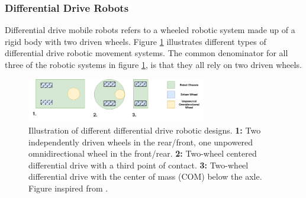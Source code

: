 \subsubsection{Differential Drive Robots}
Differential drive mobile robots refers to a wheeled robotic system made up of a rigid body with two driven wheels. Figure \ref{fig:differentialDrive} illustrates different types of differential drive robotic movement systems. The common denominator for all three of the robotic systems in figure \ref{fig:differentialDrive}, is that they all rely on two driven wheels.

\begin{figure}[H]
  \centering
  \includegraphics[width = 0.7\textwidth]{Figures/DifferentialDrive.drawio.png}
  \caption{Illustration of different differential drive robotic designs. \textbf{1:} Two independently driven wheels in the rear/front, one unpowered omnidirectional wheel in the front/rear. \textbf{2:} Two-wheel centered differential drive with a third point of contact. \textbf{3:} Two-wheel differential drive with the center of mass (COM) below the axle. Figure inspired from \cite{SiegwartRoland2011Itam}.}
  \label{fig:differentialDrive}
\end{figure}


%   


